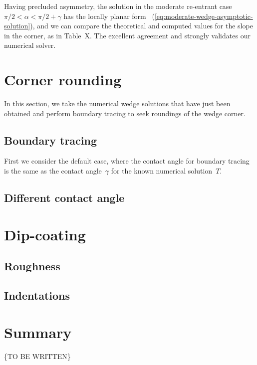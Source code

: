 Having precluded asymmetry,
the solution in the moderate re-entrant case~$\pi/2 < \alpha < \pi/2 + \gamma$
has the locally planar form~%
  (\ref{eq:moderate-wedge-asymptotic-solution}),
and we can compare the theoretical and computed values
for the slope in the corner,
as in Table~X. %
The excellent agreement
and strongly validates our numerical solver.

\section{Corner rounding}
\label{sec:re-entrant.rounding}

In this section,
we take the numerical wedge solutions that have just been obtained
and perform boundary tracing
to seek roundings of the wedge corner.

\subsection{Boundary tracing}
\label{sec:re-entrant.rounding.tracing}

First we consider the default case,
where the contact angle for boundary tracing
is the same as the contact angle~$\gamma$
for the known numerical solution~$T$.

\subsection{Different contact angle}
\label{sec:re-entrant.rounding.angle}

\section{Dip-coating}
\label{sec:re-entrant.dip-coating}

\subsection{Roughness}
\label{sec:re-entrant.dip-coating.roughness}

\subsection{Indentations}
\label{sec:re-entrant.dip-coating.indentations}

\section{Summary}
\label{sec:re-entrant.summary}

\{TO BE WRITTEN\}
